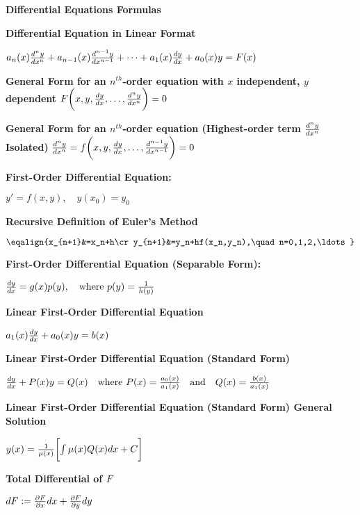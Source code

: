 \nopagenumbers
\centerline{{\bf Differential Equations Formulas}}

\vskip 5mm
{\bf Differential Equation in Linear Format}

\vskip 1mm
$a_n(x){d^ny\over dx^n}+a_{n-1}(x){d^{n-1}y\over dx^{n-1}}+\cdots+a_1(x){dy\over dx}+a_0(x)y=F(x)$

\vskip 5mm
{\bf General Form for an $n^{th}$-order equation with $x$ independent, $y$ dependent}
\vskip 1mm
$F\biggl(x,y,{dy\over dx},\ldots,{d^ny\over dx^n}\biggr)=0$

\vskip 5mm
{\bf General Form for an $n^{th}$-order equation (Highest-order term ${d^ny\over dx^n}$ Isolated)}
\vskip 1mm
${d^ny\over dx^n}=f\biggl(x,y,{dy\over dx},\ldots,{d^{n-1}y\over dx^{n-1}}\biggr)=0$

\vskip 5mm
{\bf First-Order Differential Equation:}

\vskip 1mm
$y'=f(x,y),\quad y(x_0)=y_0$

\vskip 5mm
{\bf Recursive Definition of Euler's Method}

\vskip 1mm
$\eqalign{x_{n+1}&=x_n+h\cr
	y_{n+1}&=y_n+hf(x_n,y_n),\quad n=0,1,2,\ldots}$

\vskip 5mm
{\bf First-Order Differential Equation (Separable Form):}

\vskip 1mm
${dy\over dx}=g(x)p(y),\quad\hbox{where } p(y)={1\over h(y)}$

\vskip 5mm
{\bf Linear First-Order Differential Equation}

\vskip 1mm
$a_1(x){dy\over dx}+a_0(x)y=b(x)$

\vskip 5mm
{\bf Linear First-Order Differential Equation (Standard Form)}

\vskip 1mm
${dy\over dx}+P(x)y=Q(x)\quad\hbox{where }P(x)={a_0(x)\over a_1(x)}\quad\hbox{and}\quad Q(x)={b(x)\over a_1(x)}$

\vskip 5mm
{\bf Linear First-Order Differential Equation (Standard Form) General Solution}

\vskip 1mm
$y(x)={1\over\mu(x)}\biggl[\int\mu(x)Q(x)dx+C\biggr]$

\vskip 5mm
{\bf Total Differential of $F$}

\vskip 1mm
$dF:={\partial F\over\partial x}dx+{\partial F\over\partial y}dy$

\vfill\eject
\bye
